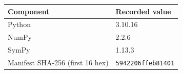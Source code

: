 \begin{tabular}{ll}
\toprule
Component & Recorded value \\
\midrule
Python & 3.10.16 \\
NumPy & 2.2.6 \\
SymPy & 1.13.3 \\
Manifest SHA-256 (first 16 hex) & \texttt{5942206ffeb81401} \\
\bottomrule
\end{tabular}

